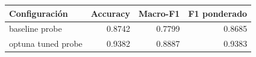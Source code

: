 \begin{tabular}{lrrr}
\toprule
\textbf{Configuración} & \textbf{Accuracy} & \textbf{Macro-F1} & \textbf{F1 ponderado} \\
\midrule
baseline probe & 0.8742 & 0.7799 & 0.8685 \\
optuna tuned probe & 0.9382 & 0.8887 & 0.9383 \\
\bottomrule
\end{tabular}
